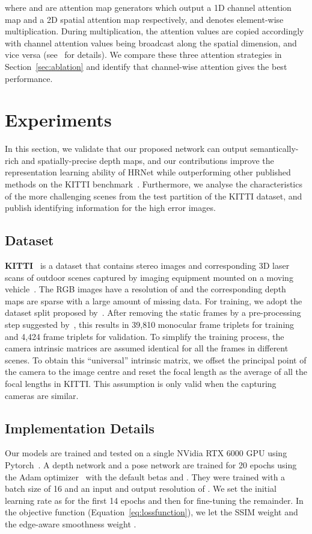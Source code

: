 \documentclass{bmvc2k}
\begin{document}
where  and  are attention map generators which output a 1D channel attention map  and a 2D spatial attention map  respectively, and  denotes element-wise multiplication. During multiplication, the attention values are copied accordingly with channel attention values being broadcast along the spatial dimension, and vice versa (see~\cite{woo2018cbam} for details). We compare these three attention strategies in Section~\ref{sec:ablation} and identify that channel-wise attention gives the best performance. 

\section{Experiments}
In this section, we validate that our proposed network can output semantically-rich and spatially-precise depth maps, and our contributions improve the representation learning ability of HRNet while outperforming other published methods on the KITTI benchmark~\cite{kitti}. Furthermore, we analyse the characteristics of the more challenging scenes from the test partition of the KITTI dataset, and publish identifying information for the high error images. 
\subsection{Dataset}
{\bf KITTI}~\cite{kitti} is a dataset that contains stereo images and corresponding 3D laser scans of outdoor scenes captured by imaging equipment mounted on a moving vehicle~\cite{kingma2015}. The RGB images have a resolution of  and the corresponding depth maps are sparse with a large amount of missing data. For training, we adopt the dataset split proposed by~\cite{Eigen2014}. After removing the static frames by a pre-processing step suggested by~\cite{zhou_sfmlearner}, this results in 39,810 monocular frame triplets for training and 4,424 frame triplets for validation. To simplify the training process, the camera intrinsic matrices are assumed identical for all the frames in different scenes. To obtain this ``universal'' intrinsic matrix, we offset the principal point of the camera to the image centre and reset the focal length as the average of all the focal lengths in KITTI. This assumption is only valid when the capturing cameras are similar.
\subsection{Implementation Details}
Our models are trained and tested on a single NVidia RTX 6000 GPU using Pytorch~\cite{paszke2019pytorch}. A depth network and a pose network are trained for 20 epochs using the Adam optimizer~\cite{kingma2015} with the default betas  and . They were trained with a batch size of 16 and an input and output resolution of .
We set the initial learning rate as  for the first 14 epochs and then  for fine-tuning the remainder. In the objective function  (Equation~\ref{eq:lossfunction}), we let the SSIM weight  and the edge-aware smoothness weight .
\end{document}
